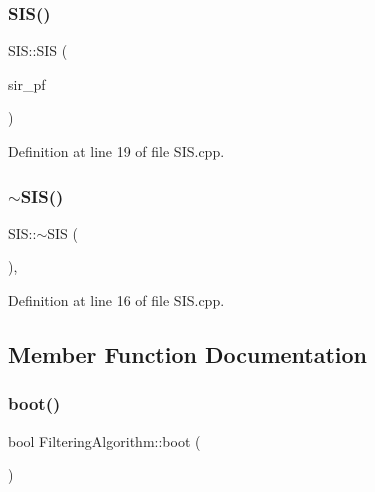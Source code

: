 \subsubsection{\texorpdfstring{S\+I\+S()}{SIS()}\hspace{0.1cm}{\footnotesize\ttfamily [2/2]}}
{\footnotesize\ttfamily S\+I\+S\+::\+S\+IS (\begin{DoxyParamCaption}\item[{\mbox{\hyperlink{classbfl_1_1SIS}{S\+IS}} \&\&}]{sir\+\_\+pf }\end{DoxyParamCaption})\hspace{0.3cm}{\ttfamily [noexcept]}}



Definition at line 19 of file S\+I\+S.\+cpp.

\mbox{\label{classbfl_1_1SIS_afe51d2eb915e0813ee4dc804a680566b}} 
\subsubsection{\texorpdfstring{$\sim$\+S\+I\+S()}{~SIS()}}
{\footnotesize\ttfamily S\+I\+S\+::$\sim$\+S\+IS (\begin{DoxyParamCaption}{ }\end{DoxyParamCaption})\hspace{0.3cm}{\ttfamily [virtual]}, {\ttfamily [noexcept]}}



Definition at line 16 of file S\+I\+S.\+cpp.



\subsection{Member Function Documentation}
\mbox{\label{classbfl_1_1FilteringAlgorithm_a96651f8464190c0a56d79219a1017147}} 
\subsubsection{\texorpdfstring{boot()}{boot()}}
{\footnotesize\ttfamily bool Filtering\+Algorithm\+::boot (\begin{DoxyParamCaption}{ }\end{DoxyParamCaption})\hspace{0.3cm}{\ttfamily [inherited]}}



